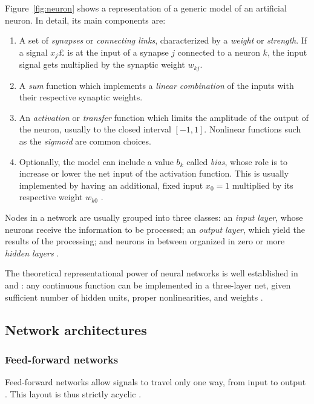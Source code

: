 \documentclass[11pt,a4paper]{report}
\begin{document}
		Figure~\ref{fig:neuron} shows a representation of a generic model of an artificial neuron. In detail, its main components are:
		\begin{enumerate}
			\item A set of \emph{synapses} or \emph{connecting links}, characterized by a \emph{weight} or \emph{strength}. If a signal $x_j£$ is at the input of a synapse $j$ connected to a neuron $k$, the input signal gets multiplied by the synaptic weight $w_{kj}$.
			\item A \emph{sum} function which implements a \emph{linear combination} of the inputs with their respective synaptic weights.
			\item An \emph{activation} or \emph{transfer} function which limits the amplitude of the output of the neuron, usually to the closed interval $\left[-1, 1\right]$. Nonlinear functions such as the \emph{sigmoid} are common choices.
			\item Optionally, the model can include a value $b_k$ called \emph{bias}, whose role is to increase or lower the net input of the activation function. This is usually implemented by having an additional, fixed input $x_0 = 1$ multiplied by its respective weight $w_{k0}$ \cite{haykin2004comprehensive}.
		\end{enumerate}
		
		Nodes in a network are usually grouped into three classes: an \emph{input layer}, whose neurons receive the information to be processed; an \emph{output layer}, which yield the results of the processing; and neurons in between organized in zero or more \emph{hidden layers} \cite{kotsiantis2007supervised}.
		
		The theoretical representational power of neural networks is well established in \cite{hornik1989multilayer} and \cite{kuurkova1992kolmogorov}: any continuous function can be implemented in a three-layer net, given sufficient number of hidden units, proper nonlinearities, and weights \cite{lam2015prslides}.
		
			\subsection{Network architectures}
				\subsubsection{Feed-forward networks}
				Feed-forward networks allow signals to travel only one way, from input to output \cite{kotsiantis2007supervised}. This layout is thus strictly acyclic \cite{haykin2004comprehensive}.
				
\end{document}
